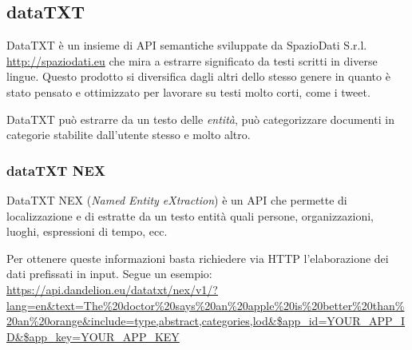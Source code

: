 \subsection{dataTXT}
	DataTXT è un insieme di API semantiche sviluppate da SpazioDati S.r.l.  \url{http://spaziodati.eu} che mira a estrarre significato da testi scritti in diverse lingue. Questo prodotto si diversifica dagli altri dello stesso genere in quanto è stato pensato e ottimizzato per lavorare su testi molto corti, come i tweet.

	DataTXT può estrarre da un testo delle \emph{entità}, può categorizzare documenti in categorie stabilite dall'utente stesso e molto altro.

%
%

	\subsubsection{dataTXT NEX}
		DataTXT NEX (\emph{Named Entity eXtraction}) è un API che permette di localizzazione e di estratte da un testo entità quali persone, organizzazioni, luoghi, espressioni di tempo, ecc.

		Per ottenere queste informazioni basta richiedere via HTTP l'elaborazione dei dati  prefissati in input. Segue un esempio: \url{https://api.dandelion.eu/datatxt/nex/v1/?lang=en&text=The%20doctor%20says%20an%20apple%20is%20better%20than%20an%20orange&include=type,abstract,categories,lod&$app_id=YOUR_APP_ID&$app_key=YOUR_APP_KEY}

